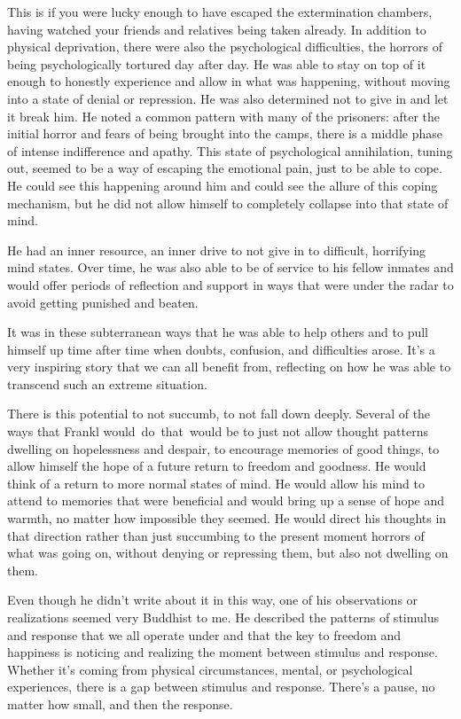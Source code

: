 This is if you were lucky enough to have escaped the extermination chambers, having watched your friends and \mbox{relatives} being taken already. In addition to physical deprivation, there were also the psychological difficulties, the horrors of being psychologically tortured day after day. He was able to stay on top of it enough to honestly experience and allow in what was happening, without moving into a state of denial or repression. He was also determined not to give in and let it break him. He noted a common pattern with many of the prisoners: after the initial horror and fears of being brought into the camps, there is a middle phase of intense indifference and apathy. This state of psychological annihilation, tuning out, seemed to be a way of escaping the emotional pain, just to be able to cope. He could see this happening around him and could see the allure of this coping mechanism, but he did not allow himself to completely collapse into that state of mind.

He had an inner resource, an inner drive to not give in to difficult, horrifying mind states. Over time, he was also able to be of service to his fellow inmates and would offer periods of reflection and support in ways that were under the radar to avoid getting punished and beaten.

It was in these subterranean ways that he was able to help others and to pull himself up time after time when doubts, confusion, and difficulties arose. It's a very inspiring story that we can all benefit from, reflecting on how he was able to transcend such an extreme situation.

There is this potential to not succumb, to not fall down deeply. Several of the ways that Frankl \mbox{would do that would} be to just not allow thought patterns dwelling on hopelessness and despair, to encourage memories of good things, to allow himself the hope of a future return to freedom and goodness. He would think of a return to more normal states of mind. He would allow his mind to attend to memories that were beneficial and would bring up a sense of hope and warmth, no matter how impossible they seemed. He would direct his thoughts in that direction rather than just succumbing to the present moment horrors of what was going on, without denying or repressing them, but also not dwelling on them.

Even though he didn't write about it in this way, one of his observations or realizations seemed very Buddhist to me. He described the patterns of stimulus and response that we all operate under and that the key to freedom and happiness is noticing and realizing the moment between stimulus and response. Whether it's coming from physical circumstances, mental, or psychological experiences, there is a gap between stimulus and response. There's a pause, no matter how small, and then the response.

